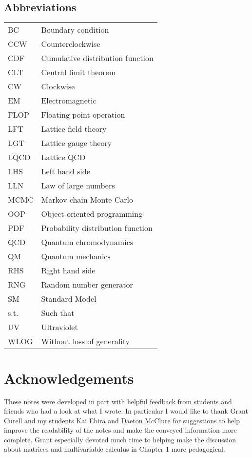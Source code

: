 \documentclass[12pt]{book}
\theoremstyle{definition}
\newenvironment{frontstuff}
  {\centering\chapter*{}}
  {\clearpage}
\begin{document}
\begin{frontstuff}
\begin{tabular}{ll}
\end{tabular}
\clearpage



\section*{Abbreviations}
\begin{tabular}{ll}
BC      &       Boundary condition \\
CCW     &       Counterclockwise\\
CDF     &       Cumulative distribution function \\
CLT     &       Central limit theorem\\
CW      &       Clockwise\\
EM      &       Electromagnetic\\
FLOP    &       Floating point operation\\
LFT     &       Lattice field theory\\
LGT     &       Lattice gauge theory\\
LQCD    &       Lattice QCD\\
LHS     &       Left hand side\\
LLN     &       Law of large numbers\\
MCMC    &       Markov chain Monte Carlo\\
OOP     &       Object-oriented programming \\
PDF     &       Probability distribution function \\
QCD     &       Quantum chromodynamics \\
QM      &       Quantum mechanics \\
RHS     &       Right hand side \\
RNG     &       Random number generator \\
SM      &       Standard Model \\
s.t.    &       Such that \\
UV      &       Ultraviolet \\
WLOG    &       Without loss of generality
\end{tabular}
\clearpage



\end{frontstuff} %


\chapter{Acknowledgements}
These notes were developed in part with helpful feedback from students
and friends who had a look at what I wrote.
In particular I would like to thank Grant Curell and my students Kai Ebira
and Daeton McClure for suggestions to help improve the readability of
the notes and make the conveyed information more complete.
Grant especially devoted much time to helping make the discussion about
matrices and multivariable calculus in Chapter 1 more pedagogical.
\end{document}
